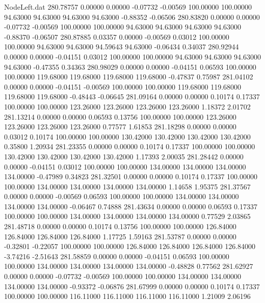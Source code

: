 \begin{filecontents}{NodeLeft.dat}
 280.78757    0.00000    0.00000    -0.07732   -0.00569  100.00000  100.00000   94.63000   94.63000   94.63000   94.63000   -0.88352   -0.06506
 280.83820    0.00000    0.00000    -0.07732   -0.00569  100.00000  100.00000   94.63000   94.63000   94.63000   94.63000   -0.88370   -0.06507
 280.87885    0.03357    0.00000    -0.00569    0.03012  100.00000  100.00000   94.63000   94.63000   94.59643   94.63000   -0.06434    0.34037
 280.92944    0.00000    0.00000    -0.04151    0.03012  100.00000  100.00000   94.63000   94.63000   94.63000   94.63000   -0.47355    0.34363
 280.98029    0.00000    0.00000    -0.04151    0.06593  100.00000  100.00000  119.68000  119.68000  119.68000  119.68000   -0.47837    0.75987
 281.04102    0.00000    0.00000    -0.04151   -0.00569  100.00000  100.00000  119.68000  119.68000  119.68000  119.68000   -0.48443   -0.06645
 281.09164    0.00000    0.00000     0.10174    0.17337  100.00000  100.00000  123.26000  123.26000  123.26000  123.26000    1.18372    2.01702
 281.13214    0.00000    0.00000     0.06593    0.13756  100.00000  100.00000  123.26000  123.26000  123.26000  123.26000    0.77577    1.61853
 281.18298    0.00000    0.00000     0.03012    0.10174  100.00000  100.00000  130.42000  130.42000  130.42000  130.42000    0.35800    1.20934
 281.23355    0.00000    0.00000     0.10174    0.17337  100.00000  100.00000  130.42000  130.42000  130.42000  130.42000    1.17393    2.00035
 281.28442    0.00000    0.00000    -0.04151    0.03012  100.00000  100.00000  134.00000  134.00000  134.00000  134.00000   -0.47989    0.34823
 281.32501    0.00000    0.00000     0.10174    0.17337  100.00000  100.00000  134.00000  134.00000  134.00000  134.00000    1.14658    1.95375
 281.37567    0.00000    0.00000    -0.00569    0.06593  100.00000  100.00000  134.00000  134.00000  134.00000  134.00000   -0.06467    0.74888
 281.43634    0.00000    0.00000     0.06593    0.17337  100.00000  100.00000  134.00000  134.00000  134.00000  134.00000    0.77529    2.03865
 281.48718    0.00000    0.00000     0.10174    0.13756  100.00000  100.00000  126.84000  126.84000  126.84000  126.84000    1.17725    1.59163
 281.53787    0.00000    0.00000    -0.32801   -0.22057  100.00000  100.00000  126.84000  126.84000  126.84000  126.84000   -3.74216   -2.51643
 281.58859    0.00000    0.00000    -0.04151    0.06593  100.00000  100.00000  134.00000  134.00000  134.00000  134.00000   -0.48828    0.77562
 281.62927    0.00000    0.00000    -0.07732   -0.00569  100.00000  100.00000  134.00000  134.00000  134.00000  134.00000   -0.93372   -0.06876
 281.67999    0.00000    0.00000     0.10174    0.17337  100.00000  100.00000  116.11000  116.11000  116.11000  116.11000    1.21009    2.06196

\end{filecontents}

